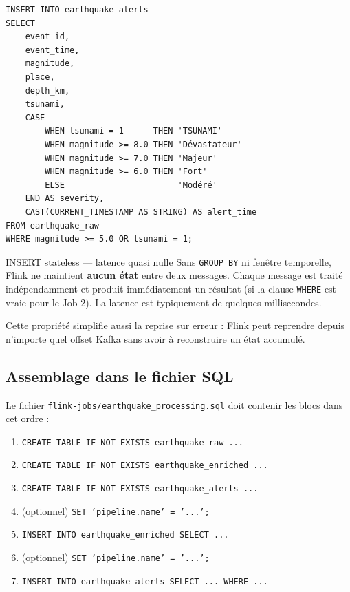 \documentclass[12pt,a4paper]{article}
\begin{document}
\begin{lstlisting}[style=sql, caption={Job 2 --- alertes avec filtre WHERE}]
INSERT INTO earthquake_alerts
SELECT
    event_id,
    event_time,
    magnitude,
    place,
    depth_km,
    tsunami,
    CASE
        WHEN tsunami = 1      THEN 'TSUNAMI'
        WHEN magnitude >= 8.0 THEN 'Dévastateur'
        WHEN magnitude >= 7.0 THEN 'Majeur'
        WHEN magnitude >= 6.0 THEN 'Fort'
        ELSE                       'Modéré'
    END AS severity,
    CAST(CURRENT_TIMESTAMP AS STRING) AS alert_time
FROM earthquake_raw
WHERE magnitude >= 5.0 OR tsunami = 1;
\end{lstlisting}

\begin{conceptbox}{INSERT stateless --- latence quasi nulle}
  Sans \texttt{GROUP BY} ni fenêtre temporelle, Flink ne maintient \textbf{aucun état}
  entre deux messages. Chaque message est traité indépendamment et produit immédiatement
  un résultat (si la clause \texttt{WHERE} est vraie pour le Job 2).
  La latence est typiquement de quelques millisecondes.

  Cette propriété simplifie aussi la reprise sur erreur : Flink peut reprendre
  depuis n'importe quel offset Kafka sans avoir à reconstruire un état accumulé.
\end{conceptbox}

\subsection{Assemblage dans le fichier SQL}

Le fichier \texttt{flink-jobs/earthquake\_processing.sql} doit contenir les blocs
dans cet ordre :

\begin{enumerate}
  \item \texttt{CREATE TABLE IF NOT EXISTS earthquake\_raw ...}
  \item \texttt{CREATE TABLE IF NOT EXISTS earthquake\_enriched ...}
  \item \texttt{CREATE TABLE IF NOT EXISTS earthquake\_alerts ...}
  \item (optionnel) \texttt{SET 'pipeline.name' = '...';}
  \item \texttt{INSERT INTO earthquake\_enriched SELECT ...}
  \item (optionnel) \texttt{SET 'pipeline.name' = '...';}
  \item \texttt{INSERT INTO earthquake\_alerts SELECT ... WHERE ...}
\end{enumerate}
\end{document}
